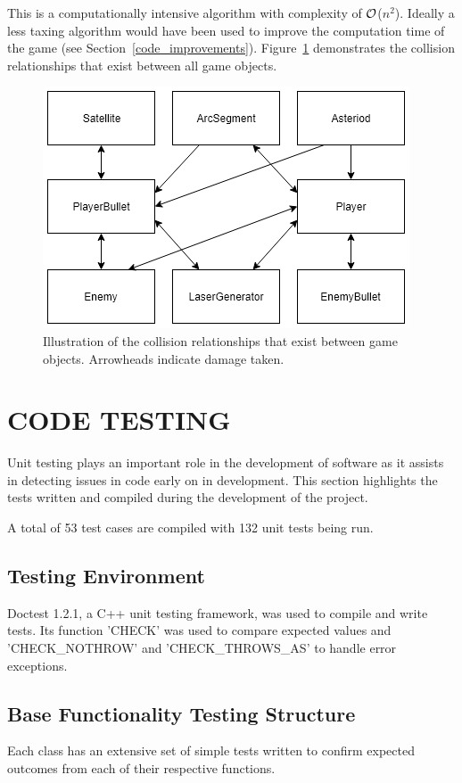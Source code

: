 \documentclass[10pt,twocolumn]{witseiepaper}
\begin{document}
This is a computationally intensive algorithm with complexity of $\cal{O}$($n^{2}$). Ideally a less taxing algorithm would have been used to improve the computation time of the game (see Section~\ref{code_improvements}). Figure~\ref{fig:collisions} demonstrates the collision relationships that exist between all game objects.

\begin{figure}[h]
	\centering
	\includegraphics[width=0.9\columnwidth]{collisions.png}
	\caption{Illustration of the collision relationships that exist between game objects. Arrowheads indicate damage taken.}
	\raggedright
	\label{fig:collisions}
\end{figure}


\section{CODE TESTING}
Unit testing plays an important role in the development of software as it assists in detecting issues in code early on in development.
This section highlights the tests written and compiled during the development of the project. 

A total of 53 test cases are compiled with 132 unit tests being run.

\subsection{Testing Environment}
Doctest 1.2.1, a C++ unit testing framework, was used to compile and write tests. Its function 'CHECK' was used to compare expected values and 'CHECK\_NOTHROW' and 'CHECK\_THROWS\_AS' to handle error exceptions.
 
\subsection{Base Functionality Testing Structure}
Each class has an extensive set of simple tests written to confirm expected outcomes from each of their respective functions. 
\end{document}
